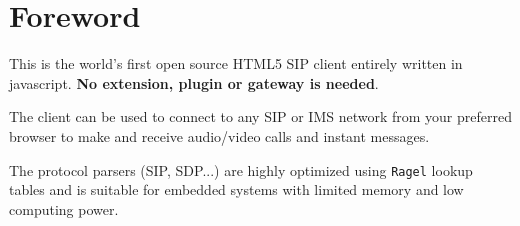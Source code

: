\section*{Foreword }

This is the world's first open source H\-T\-M\-L5 S\-I\-P client entirely written in javascript. {\bfseries No extension, plugin or gateway is needed}.\par
 The client can be used to connect to any S\-I\-P or I\-M\-S network from your preferred browser to make and receive audio/video calls and instant messages.\par
 The protocol parsers (S\-I\-P, S\-D\-P...) are highly optimized using {\tt Ragel} lookup tables and is suitable for embedded systems with limited memory and low computing power. 